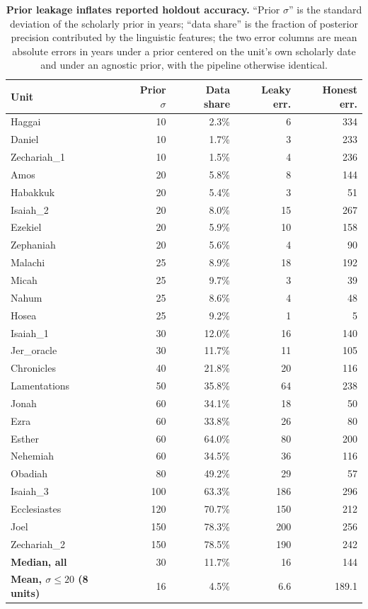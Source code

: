 \begin{table}[!ht]
\centering
\footnotesize
\caption{\textbf{Prior leakage inflates reported holdout accuracy.}  ``Prior $\sigma$'' is the standard deviation of the scholarly prior in years; ``data share'' is the fraction of posterior precision contributed by the linguistic features; the two error columns are mean absolute errors in years under a prior centered on the unit's own scholarly date and under an agnostic prior, with the pipeline otherwise identical.}
\label{tab:leakage}
\begin{tabular}{lrrrr}
\toprule
\textbf{Unit} & \textbf{Prior $\sigma$} & \textbf{Data share} & \textbf{Leaky err.} & \textbf{Honest err.} \\
\midrule
Haggai & 10 & 2.3\% & 6 & 334 \\
Daniel & 10 & 1.7\% & 3 & 233 \\
Zechariah\_1 & 10 & 1.5\% & 4 & 236 \\
Amos & 20 & 5.8\% & 8 & 144 \\
Habakkuk & 20 & 5.4\% & 3 & 51 \\
Isaiah\_2 & 20 & 8.0\% & 15 & 267 \\
Ezekiel & 20 & 5.9\% & 10 & 158 \\
Zephaniah & 20 & 5.6\% & 4 & 90 \\
Malachi & 25 & 8.9\% & 18 & 192 \\
Micah & 25 & 9.7\% & 3 & 39 \\
Nahum & 25 & 8.6\% & 4 & 48 \\
Hosea & 25 & 9.2\% & 1 & 5 \\
Isaiah\_1 & 30 & 12.0\% & 16 & 140 \\
Jer\_oracle & 30 & 11.7\% & 11 & 105 \\
Chronicles & 40 & 21.8\% & 20 & 116 \\
Lamentations & 50 & 35.8\% & 64 & 238 \\
Jonah & 60 & 34.1\% & 18 & 50 \\
Ezra & 60 & 33.8\% & 26 & 80 \\
Esther & 60 & 64.0\% & 80 & 200 \\
Nehemiah & 60 & 34.5\% & 36 & 116 \\
Obadiah & 80 & 49.2\% & 29 & 57 \\
Isaiah\_3 & 100 & 63.3\% & 186 & 296 \\
Ecclesiastes & 120 & 70.7\% & 150 & 212 \\
Joel & 150 & 78.3\% & 200 & 256 \\
Zechariah\_2 & 150 & 78.5\% & 190 & 242 \\
\midrule
\textbf{Median, all} & 30 & 11.7\% & 16 & 144 \\
\textbf{Mean, $\sigma \leq 20$ (8 units)} & 16 & 4.5\% & 6.6 & 189.1 \\
\bottomrule
\end{tabular}
\end{table}
